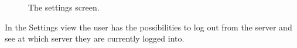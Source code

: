 \begin{figure}[htb]
\caption{The settings screen.}
\label{fig:ios_more}
\end{figure}
\FloatBarrier
In the Settings view the user has the possibilities to log out from the server and see at which server they are currently logged into. 









